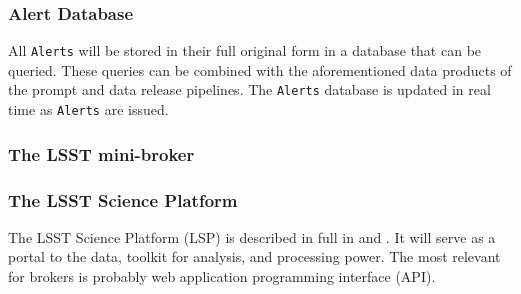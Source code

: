 \subsubsection{Alert Database}

All {\tt Alerts} will be stored in their full original form in a database that can be queried.
These queries can be combined with the aforementioned data products of the prompt and data release pipelines.
The {\tt Alerts} database is updated in real time as {\tt Alerts} are issued.

\subsubsection{The LSST mini-broker}\label{sssec:mini-broker}

\subsubsection{The LSST Science Platform}

The LSST Science Platform (LSP) is described in full in  and .
It will serve as a portal to the data, toolkit for analysis, and processing power.
The most relevant for brokers is probably web application programming interface (API).



